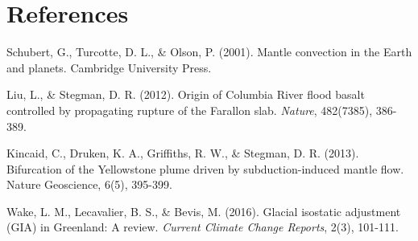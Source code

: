 \documentclass[notitlepage]{article}
\begin{document}
\section*{References}
Schubert, G., Turcotte, D. L., \& Olson, P. (2001). Mantle convection in the Earth and planets. Cambridge University Press.

Liu, L., \& Stegman, D. R. (2012). Origin of Columbia River flood basalt controlled by propagating rupture of the Farallon slab. \textit{Nature}, 482(7385), 386-389.

Kincaid, C., Druken, K. A., Griffiths, R. W., \& Stegman, D. R. (2013). Bifurcation of the Yellowstone plume driven by subduction-induced mantle flow. Nature Geoscience, 6(5), 395-399.

Wake, L. M., Lecavalier, B. S., \& Bevis, M. (2016). Glacial isostatic adjustment (GIA) in Greenland: A review. \textit{Current Climate Change Reports}, 2(3), 101-111.
\end{document}
